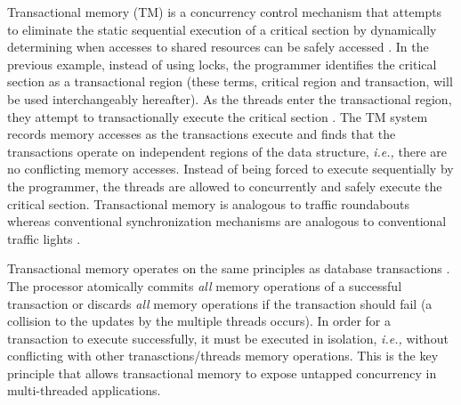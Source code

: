\documentclass[11pt]{book}
\begin{document}
Transactional memory (TM) is a concurrency control mechanism that attempts to eliminate
the static sequential execution of a critical section by dynamically determining when
accesses to shared resources can be safely accessed \cite{sle_rajwar}.  In the previous
example, instead of using locks, the programmer identifies the critical section as a
transactional region (these terms, critical region and transaction, will be used
interchangeably hereafter).  As the threads enter the transactional region, they attempt
to transactionally execute the critical section .  The TM system records memory accesses
as the transactions execute and finds that the transactions operate on independent regions
of the data structure, \emph{i.e.,} there are no conflicting memory accesses.  Instead of
being forced to execute sequentially by the programmer, the threads are allowed to
concurrently and safely execute the critical section.  Transactional memory is analogous
to traffic roundabouts whereas conventional synchronization mechanisms are analogous to
conventional traffic lights \cite{neuling_vid}.

Transactional memory operates on the same principles as database transactions
\cite{tm_2nd}.  The processor atomically commits \emph{all} memory operations of a
successful transaction or discards \emph{all} memory operations if the transaction should
fail (a collision to the updates by the multiple threads occurs).  In order for a
transaction to execute successfully, it must be executed in isolation, \emph{i.e.,}
without conflicting with other tranasctions/threads memory operations.  This is the key
principle that allows transactional memory to expose untapped concurrency in
multi-threaded applications.
\end{document}
